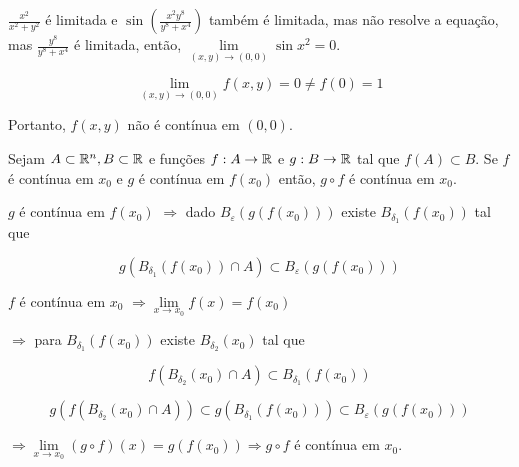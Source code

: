 \documentclass{book}
\begin{document}
\begin{sol}
    $\displaystyle \frac{{x^2 }}{{x^2  + y^2 }}$ \'e limitada e $\displaystyle \sin \left( {\frac{{x^2 y^8 }}{{y^8  + x^4 }}} \right)$ tamb\'em \'e limitada, mas n\~ao resolve a equa\c c\~ao, mas $\displaystyle \frac{{y^8 }}{{y^8  + x^4 }}$ \'e limitada, ent\~ao, $\mathop {\lim }\limits_{\left( {x,y} \right) \to \left( {0,0} \right)} \sin x^2  = 0$.

\[
    \mathop {\lim }\limits_{\left( {x,y} \right) \to \left( {0,0} \right)} f\left( {x,y} \right) = 0 \ne f\left( 0 \right) = 1
\]

Portanto, $f(x,y)$ n\~ao \'e cont\'inua em $(0,0)$.

\end{sol}

\begin{teo}
    Sejam $A \subset \mathbb{R}^n ,B \subset \mathbb{R}$ e fun\c c\~oes $f:A \to \mathbb{R}$ e $g:B \to \mathbb{R}$ tal que $f\left( A \right) \subset B$. Se $f$ \'e cont\'inua em $x_0$ e $g$ \'e cont\'inua em $f\left( {x_0 } \right)$ ent\~ao, $g \circ f$ \'e cont\'inua em $x_0$.
\end{teo}

\begin{dem}
$g$ \'e cont\'inua em $f\left( {x_0 } \right)$
    $\Rightarrow$ dado $B_\varepsilon  \left( {g\left( {f\left( {x_0 } \right)} \right)} \right)$ existe $B_{\delta _1 } \left( {f\left( {x_0 } \right)} \right)$ tal que

\[
    g\left( {B_{\delta _1 } \left( {f\left( {x_0 } \right)} \right) \cap A} \right) \subset B_\varepsilon  \left( {g\left( {f\left( {x_0 } \right)} \right)} \right)
\]

    $f$ \'e cont\'inua em $x_0$ $\Rightarrow \mathop {\lim }\limits_{x \to x_0 } f\left( x \right) = f\left( {x_0 } \right)$

    $\Rightarrow$ para $B_{\delta _1 } \left( {f\left( {x_0 } \right)} \right)$ existe $B_{\delta _2 } \left( {x_0 } \right)$ tal que

\[
    f\left( {B_{\delta _2 } \left( {x_0 } \right) \cap A} \right) \subset B_{\delta _1 } \left( {f\left( {x_0 } \right)} \right)
\]

\[
    g\left( {f\left( {B_{\delta _2 } \left( {x_0 } \right) \cap A} \right)} \right) \subset g\left( {B_{\delta _1 } \left( {f\left( {x_0 } \right)} \right)} \right) \subset B_\varepsilon  \left( {g\left( {f\left( {x_0 } \right)} \right)} \right)
\]

    $\Rightarrow \mathop {\lim }\limits_{x \to x_0 } \left( {g \circ f} \right)\left( x \right) = g\left( {f\left( {x_0 } \right)} \right) \Rightarrow g \circ f$ \'e cont\'inua em $x_0$.
\end{dem}
\end{document}
